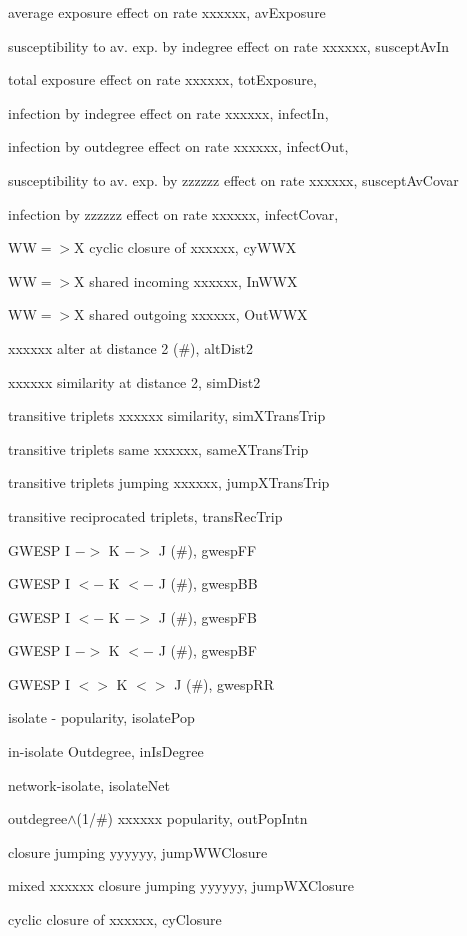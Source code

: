 \documentclass[a4paper,fleqn,11pt]{article}
\newcommand{\+}{\, + \,}
\newcommand{\sfn}[1]{\textsf{#1}}
\begin{document}
{\begin{small}
\begin{itemize}
\begin{itemize}
		average exposure effect on rate xxxxxx, \sfn{avExposure}

		susceptibility to av. exp. by indegree effect on rate xxxxxx,
			\sfn{susceptAvIn}

		total exposure effect on rate xxxxxx, \sfn{totExposure},

		infection by indegree effect on rate xxxxxx, \sfn{infectIn},

		infection by outdegree effect on rate xxxxxx, \sfn{infectOut},

		susceptibility to av. exp. by zzzzzz effect on rate xxxxxx,
			\sfn{susceptAvCovar}

		infection by zzzzzz effect on rate xxxxxx, \sfn{infectCovar,}

		WW$=>$X cyclic closure of xxxxxx, \sfn{cyWWX}

		WW$=>$X shared incoming xxxxxx, \sfn{InWWX}

		WW$=>$X shared outgoing xxxxxx, \sfn{OutWWX}

		xxxxxx alter at distance 2 (\#), \sfn{altDist2}

		xxxxxx similarity at distance 2, \sfn{simDist2}

		transitive triplets xxxxxx similarity, \sfn{simXTransTrip}

		transitive triplets same xxxxxx, \sfn{sameXTransTrip}

		transitive triplets jumping xxxxxx, \sfn{jumpXTransTrip}

		transitive reciprocated triplets, \sfn{transRecTrip}

		GWESP I $->$ K $->$ J (\#), \sfn{gwespFF}

		GWESP I $<-$ K $<-$ J (\#), \sfn{gwespBB}

		GWESP I $<-$ K $->$ J (\#), \sfn{gwespFB}

		GWESP I $->$ K $<-$ J (\#), \sfn{gwespBF}

		GWESP I $<>$ K $<>$ J (\#), \sfn{gwespRR}

		isolate - popularity, \sfn{isolatePop}

		in-isolate Outdegree, \sfn{inIsDegree}

		network-isolate, \sfn{isolateNet}

		outdegree$\wedge$(1/\#) xxxxxx popularity, \sfn{outPopIntn}

		closure jumping yyyyyy, \sfn{jumpWWClosure}

		mixed xxxxxx closure jumping yyyyyy, \sfn{jumpWXClosure}

		cyclic closure of xxxxxx, \sfn{cyClosure}


\end{itemize}
\end{itemize}
\end{small}}
\end{document}
